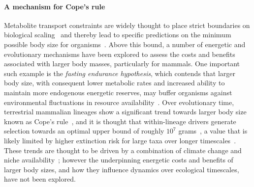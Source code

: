\documentclass[twocolumn,preprintnumbers,amsmath,amssymb,superscriptaddress]{revtex4}
\begin{document}



\noindent \paragraph*{{\bf A mechanism for Cope's rule}} Metabolite transport constraints are widely thought to place strict boundaries on biological scaling~\citep{Brown:1993p708,West:1997cg,Brown:2004wq} and thereby lead to specific predictions on the minimum possible body size for organisms~\citep{West:2002ud}.
Above this bound, a number of energetic and evolutionary mechanisms have been explored to assess the costs and benefits associated with larger body masses, particularly for mammals.
One important such example is the \emph{fasting endurance hypothesis}, which contends that larger body size, with consequent lower metabolic rates and increased ability to maintain more endogenous energetic reserves, may buffer organisms against environmental fluctuations in resource availability~\citep{Millar:1990p923}.
Over evolutionary time, terrestrial mammalian lineages show a significant trend towards larger body size known as Cope's rule~\citep{Alroy:1998p1594,Clauset:2009fh,Smith:2010p3442,Saarinen:2014br}, and it is thought that within-lineage drivers generate selection towards an optimal upper bound of roughly $10^7$ grams~\citep{Alroy:1998p1594}, a value that is likely limited by higher extinction risk for large taxa over longer timescales~\citep{Clauset:2009fh}.
These trends are thought to be driven by a combination of climate change and niche availability~\citep{Saarinen:2014br}; however the underpinning energetic costs and benefits of larger body sizes, and how they influence dynamics over ecological timescales, have not been explored.
\end{document}
